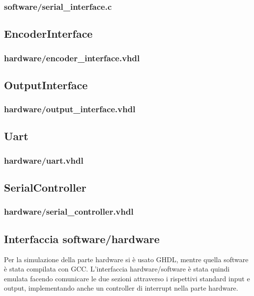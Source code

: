 \documentclass [11pt,a4paper,oneside]{article}
\begin{document}
\subsubsection{software/serial\_interface.c}


\subsection{EncoderInterface}
\subsubsection{hardware/encoder\_interface.vhdl}


\subsection{OutputInterface}
\subsubsection{hardware/output\_interface.vhdl}


\subsection{Uart}
\subsubsection{hardware/uart.vhdl}


\subsection{SerialController}
\subsubsection{hardware/serial\_controller.vhdl}


\subsection{Interfaccia software/hardware}
Per la simulazione della parte hardware si è usato GHDL, mentre quella software
è stata compilata con GCC. L'interfaccia hardware/software è stata quindi emulata
facendo comunicare le due sezioni attraverso i rispettivi standard input e output,
implementando anche un controller di interrupt nella parte hardware.
\end{document}
